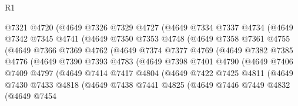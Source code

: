 \begin{lexlean}{R1}
\begin{coremodule}
                @7321
                @4720
                (@4649
                  @7326
                  @7329
                  @4727
                  (@4649
                    @7334
                    @7337
                    @4734
                    (@4649
                      @7342
                      @7345
                      @4741
                      (@4649
                        @7350
                        @7353
                        @4748
                        (@4649
                          @7358
                          @7361
                          @4755
                          (@4649
                            @7366
                            @7369
                            @4762
                            (@4649
                              @7374
                              @7377
                              @4769
                              (@4649
                                @7382
                                @7385
                                @4776
                                (@4649
                                  @7390
                                  @7393
                                  @4783
                                  (@4649
                                    @7398
                                    @7401
                                    @4790
                                    (@4649
                                      @7406
                                      @7409
                                      @4797
                                      (@4649
                                        @7414
                                        @7417
                                        @4804
                                        (@4649
                                          @7422
                                          @7425
                                          @4811
                                          (@4649
                                            @7430
                                            @7433
                                            @4818
                                            (@4649
                                              @7438
                                              @7441
                                              @4825
                                              (@4649
                                                @7446
                                                @7449
                                                @4832
                                                (@4649
                                                  @7454

\end{coremodule}
\end{lexlean}
